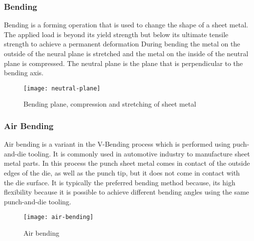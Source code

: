 \subsubsection{Bending}
Bending is a forming operation that is used to change the shape of a sheet metal. The applied load is beyond its yield strength but below its ultimate tensile strength to achieve a permanent deformation \cite[p. 1]{baig_machinelearningprediction_2021}
During bending the metal on the outside of the neural plane is stretched and the metal on the inside of the neutral plane is compressed. The neutral plane is the plane that is perpendicular to the bending axis. \cite[p. 3]{baig_machinelearningprediction_2021}


\begin{figure}[H]
    \centering
    \texttt{[image: neutral-plane]}
    \caption{Bending plane, compression and stretching of sheet metal \cite[p. 3]{baig_machinelearningprediction_2021}}
    \label{fig:neutral-plane}
\end{figure}

\subsubsection{Air Bending}
Air bending is a variant in the V-Bending process which is performed using puch-and-die tooling. \cite[p. 416]{groover_fundamentalsmodernmanufacturing_2020} 
It is commonly used in automotive industry to manufacture sheet metal parts. \cite{kim_predictionbendallowance_2007}
In this process the punch sheet metal comes in contact of the outside edges of the die, as well as the punch tip, but it does not come in contact with the die surface. 
It is typically the preferred bending method because, its high flexibility because it is possible to achieve different bending angles using the same punch-and-die tooling.
\cite[p. 3]{miranda_formingspringbackprediction_2018}\cite[p. 1]{cruz_applicationmachinelearning_2021} 

\begin{figure}[H]
    \centering
    \texttt{[image: air-bending]}
    \caption{Air bending \cite[p. 416]{groover_fundamentalsmodernmanufacturing_2020}}
    \label{fig:air-bending}
\end{figure}

